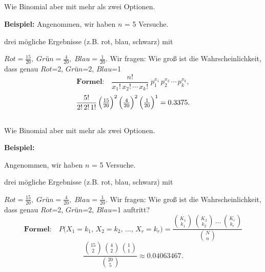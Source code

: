 \subsection*{\centering{}}
\begin{center}
\normalsize
\textcolor{red}{\warning}\textcolor{red}{\warning} Wie Binomial aber mit mehr als zwei Optionen.\textcolor{red}{\warning}\textcolor{red}{\warning}
\end{center}

\textbf{Beispiel:}
Angenommen, wir haben $n$ = 5 Versuche.

drei mögliche Ergebnisse (z.B. rot, blau, schwarz) mit 

$Rot = \frac{15}{20},\;Grün = \frac{4}{20},\;Blau = \frac{1}{20}$.
Wir fragen: Wie groß ist die Wahrscheinlichkeit, dass genau 
$Rot$=2,\; $Grün$=2,\; $Blau$=1
\[
\textbf{Formel:}\quad\frac{n!}{x_1!\,x_2!\,\cdots\,x_k!}\;p_1^{x_1}\,p_2^{x_2}\,\cdots\,p_k^{x_k},
\]
\large{\[
\frac{5!}{2!\,2!\,1!}\,\Bigl(\tfrac{15}{20}\Bigr)^2\,\Bigl(\tfrac{4}{20}\Bigr)^2\,\Bigl(\tfrac{1}{20}\Bigr)^1
= 0.3375.
\]}
\normalsize
{}

\subsection*{\centering{}}
\begin{center}
{\centering{}}

\normalsize
\textcolor{red}{\warning}\textcolor{red}{\warning} Wie Binomial aber mit mehr als zwei Optionen. \textcolor{red}{\warning}\textcolor{red}{\warning}
\end{center}


\textbf{Beispiel:}

Angenommen, wir haben $n$ = 5 Versuche.

drei mögliche Ergebnisse (z.B. rot, blau, schwarz) mit 

$Rot = \frac{15}{20},\;Grün = \frac{4}{20},\;Blau = \frac{1}{20}$.
Wir fragen: Wie groß ist die Wahrscheinlichkeit, dass genau 
$Rot$=2,\; $Grün$=2,\; $Blau$=1
auftritt?
\[
\textbf{Formel:}\quad
P\bigl(X_1 = k_1,\,X_2 = k_2,\,\dots,\,X_r = k_r\bigr)
= \frac{\binom{K_1}{k_1}\,\binom{K_2}{k_2}\,\dots\,\binom{K_r}{k_r}}{\binom{N}{n}}
\]
\[
\frac{\binom{15}{2}\,\binom{4}{2}\,\binom{1}{1}}{\binom{20}{5}}
\approx 0.04063467.
\]
\columnbreak
